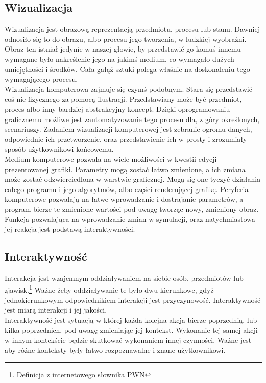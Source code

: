 \documentclass{article} %
\begin{document}
    \subsection{Wizualizacja}
        Wizualizacja jest obrazową reprezentacją przedmiotu, procesu lub stanu. Dawniej odnosiło się to do obrazu, albo procesu jego tworzenia, w ludzkiej wyobraźni. Obraz ten istniał jedynie w naszej głowie, by przedstawić go komuś innemu wymagane było nakreślenie jego na jakimś medium, co wymagało dużych umiejętności i środków. Cała gałąź sztuki polega właśnie na doskonaleniu tego wymagającego procesu.
        \\
        
        Wizualizacja komputerowa zajmuje się czymś podobnym. Stara się przedstawić coś nie fizycznego za pomocą ilustracji. Przedstawiany może być przedmiot, proces albo inny bardziej abstrakcyjny koncept. Dzięki oprogramowaniu graficznemu możliwe jest zautomatyzowanie tego procesu dla, z góry określonych, scenariuszy. Zadaniem wizualizacji komputerowej jest zebranie ogromu danych, odpowiednie ich przetworzenie, oraz przedstawienie ich w prosty i zrozumiały sposób użytkownikowi końcowemu.
        \\
        
        Medium komputerowe pozwala na wiele możliwości w kwestii edycji prezentowanej grafiki. Parametry mogą zostać łatwo zmienione, a ich zmiana może zostać odzwierciedlona w warstwie graficznej. Mogą się one tyczyć działania całego programu i jego algorytmów, albo części renderującej grafikę. Peryferia komputerowe pozwalają na łatwe wprowadzanie i dostrajanie parametrów, a program bierze te zmienione wartości pod uwagę tworząc nowy, zmieniony obraz. Funkcja pozwalająca na wprowadzanie zmian w symulacji, oraz natychmiastowa jej reakcja jest podstawą interaktywności.
        \\
            
    \subsection{Interaktywność}
        Interakcja jest wzajemnym oddziaływaniem na siebie osób, przedmiotów lub zjawisk.\footnote[1]{Definicja z internetowego słownika PWN} Ważne żeby oddziaływanie te było dwu-kierunkowe, gdyż jednokierunkowym odpowiednikiem interakcji jest przyczynowość. Interaktywność jest miarą interakcji i jej jakości. 
        \\
    
        Interaktywność jest sytuacją w której każda kolejna akcja bierze poprzednią, lub kilka poprzednich, pod uwagę zmieniając jej kontekst. Wykonanie tej samej akcji w innym kontekście będzie skutkować wykonaniem innej czynności. Ważne jest aby różne konteksty były łatwo rozpoznawalne i znane użytkownikowi.
        \\
    
\end{document}
